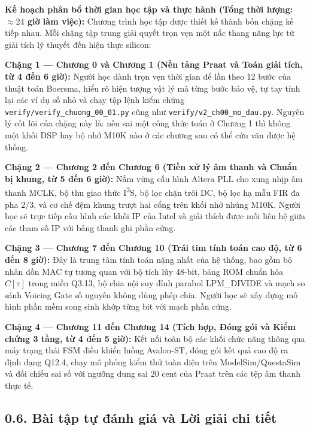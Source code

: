 \begin{costbox}
\textbf{Kế hoạch phân bổ thời gian học tập và thực hành (Tổng thời lượng: $\approx 24$ giờ làm việc):}
Chương trình học tập được thiết kế thành bốn chặng kế tiếp nhau. Mỗi chặng tập trung giải quyết trọn vẹn một nấc thang năng lực từ giải tích lý thuyết đến hiện thực silicon:

\textbf{Chặng 1 --- Chương 0 và Chương 1 (Nền tảng Praat và Toán giải tích, từ 4 đến 6 giờ):} Người học dành trọn vẹn thời gian để lần theo 12 bước của thuật toán Boersma, hiểu rõ hiện tượng vật lý mà từng bước bảo vệ, tự tay tính lại các ví dụ số nhỏ và chạy tập lệnh kiểm chứng \texttt{verify/verify\_chuong\_00\_01.py} cũng như \texttt{verify/v2\_ch00\_mo\_dau.py}. Nguyên lý cốt lõi của chặng này là: nếu sai một công thức toán ở Chương 1 thì không một khối DSP hay bộ nhớ M10K nào ở các chương sau có thể cứu vãn được hệ thống.

\textbf{Chặng 2 --- Chương 2 đến Chương 6 (Tiền xử lý âm thanh và Chuẩn bị khung, từ 5 đến 6 giờ):} Nắm vững cấu hình Altera PLL cho xung nhịp âm thanh MCLK, bộ thu giao thức I\textsuperscript{2}S, bộ lọc chặn trôi DC, bộ lọc hạ mẫu FIR đa pha $2/3$, và cơ chế đệm khung trượt hai cổng trên khối nhớ nhúng M10K. Người học sẽ trực tiếp cấu hình các khối IP của Intel và giải thích được mối liên hệ giữa các tham số IP với bảng thanh ghi phần cứng.

\textbf{Chặng 3 --- Chương 7 đến Chương 10 (Trái tim tính toán cao độ, từ 6 đến 8 giờ):} Đây là trung tâm tính toán nặng nhất của hệ thống, bao gồm bộ nhân dồn MAC tự tương quan với bộ tích lũy 48-bit, bảng ROM chuẩn hóa $C[\tau]$ trong miền Q3.13, bộ chia nội suy đỉnh parabol LPM\_DIVIDE và mạch so sánh Voicing Gate số nguyên không dùng phép chia. Người học sẽ xây dựng mô hình phần mềm song sinh khớp từng bit với mạch phần cứng.

\textbf{Chặng 4 --- Chương 11 đến Chương 14 (Tích hợp, Đóng gói và Kiểm chứng 3 tầng, từ 4 đến 5 giờ):} Kết nối toàn bộ các khối chức năng thông qua máy trạng thái FSM điều khiển luồng Avalon-ST, đóng gói kết quả cao độ ra định dạng Q12.4, chạy mô phỏng kiểm thử toàn diện trên ModelSim/QuestaSim và đối chiếu sai số với ngưỡng dung sai 20 cent của Praat trên các tệp âm thanh thực tế.
\end{costbox}

\subsection*{0.6. Bài tập tự đánh giá và Lời giải chi tiết}

